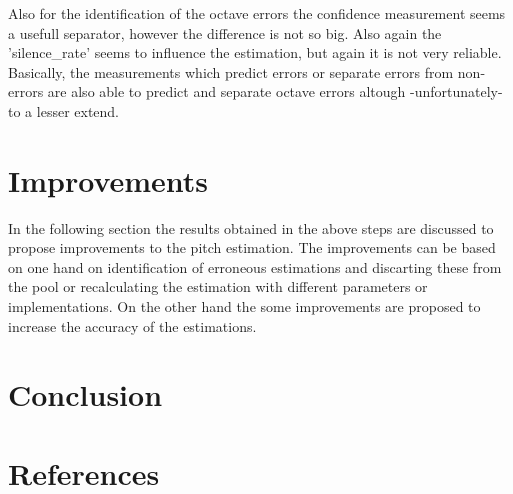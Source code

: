 \documentclass{article}
\begin{document}
Also for the identification of the octave errors the confidence measurement seems a usefull separator, however the difference is not so big. Also again the 'silence\_rate' seems to influence the estimation, but again it is not very reliable. Basically, the measurements which predict errors or separate errors from non-errors are also able to predict and separate octave errors altough -unfortunately- to a lesser extend. 

\section{Improvements}
In the following section the results obtained in the above steps are discussed to propose improvements to the pitch estimation. The improvements can be based on one hand on identification of erroneous estimations and discarting these from the pool or recalculating the estimation with different parameters or implementations. On the other hand the some improvements are proposed to increase the accuracy of the estimations.




\section{Conclusion}



\section{References}
\end{document}
